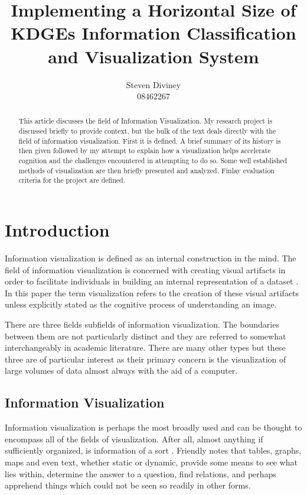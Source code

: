 \documentclass[a4paper, 10pt, titlepage, twocolumn]{article}
\begin{document}
\title{Implementing a Horizontal Size of KDGEs Information Classification and Visualization System}
\author{Steven Diviney \\
08462267
}


\maketitle

\newpage

\begin{abstract}
This article discusses the field of Information Visualization. My research project is discussed briefly to provide context, but the bulk of the text deals directly with the field of information visualization. First it is defined. A brief summary of its history is then given followed by my attempt to explain how a visualization helps accelerate cognition and the challenges encountered in attempting to do so. Some well established methods of visualization are then briefly presented and analyzed. Finlay evaluation criteria for the project are defined. 
\end{abstract}


\section{Introduction}
Information visualization is defined as an internal construction in the mind. The field of information visualization is concerned with creating visual artifacts in order to facilitate individuals in building an internal representation of a dataset \cite{spence2001information}. In this paper the term visualization refers to the creation of these visual artifacts unless explicitly stated as the cognitive process of understanding an image.

There are three fields subfields of information visualization. The boundaries between them are not particularly distinct and they are referred to somewhat interchangeably in academic literature. There are many other types but these three are of particular interest as their primary concern is the visualization of large volumes of data almost always with the aid of a computer.
\subsection{Information Visualization}
Information visualization is perhaps the most broadly used and can be thought to encompass all of the fields of visualization. After all, almost anything if sufficiently organized, is information of a sort \cite{friendly2001milestones}. Friendly notes that tables, graphs, maps and even text, whether static or dynamic, provide some means to see what lies within, determine the answer to a question, find relations, and perhaps apprehend things which could not be seen so readily in other forms. 
\end{document}
